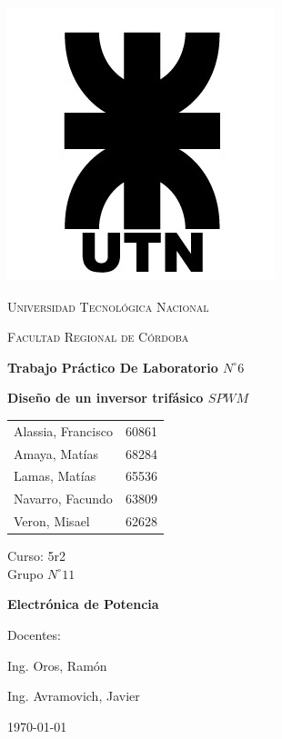 \documentclass[11pt, a4paper]{article}
\begin{document}
\begin{titlepage}
 \centering
	\includegraphics[scale=0.80]{Imagen/LOGO.jpg} \par
 	\vspace{1cm}
 	{\scshape\LARGE Universidad Tecnológica Nacional \par}
 	{\scshape\large Facultad Regional de Córdoba \par}
 	\vspace{1cm}
	{\bfseries \Large Trabajo Práctico De Laboratorio $N^{\circ} 6$\par}
	{\bfseries \Large Diseño de un inversor trifásico $SPWM$ \par}
 	\vspace{1.5cm}

	\begin{tabular}{ll}
		Alassia, Francisco		&	60861	\\
		Amaya, Matías			&	68284	\\
		Lamas, Matías			&	65536 	\\
		Navarro, Facundo		&	63809 	\\
		Veron, Misael			&	62628
	\end{tabular}
	
	\vspace{1cm}
	Curso: 5r2 \\
	Grupo $N^{\circ} 11$
 	\vfill
	{\bfseries \Large Electrónica de Potencia \par}

	\vspace{1.5cm}
	Docentes: \par
	Ing. Oros, Ramón \par
	Ing. Avramovich, Javier \par

 	\vfill
	{\large \today\par}
\end{titlepage}
	
\end{document}
